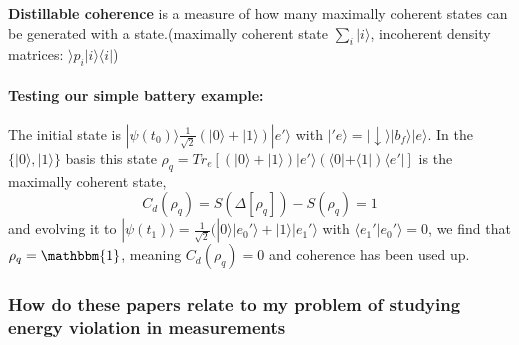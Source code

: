 \documentclass{article}
\begin{document}
\textbf{Distillable coherence} is a measure of how many maximally coherent states can be generated with a state.(maximally coherent state $\sum_{i}|i\rangle$, incoherent density matrices: $\rangle p_i|i\rangle\langle i|$)

\paragraph{Testing our simple battery example:}
The initial state is $|\psi(t_0)\rangle\frac{1}{\sqrt{2}}(|0\rangle+|1\rangle)|e'\rangle$ with $|'e\rangle=|\downarrow\rangle|b_f\rangle|e\rangle$. In the $\{|0\rangle,|1\rangle\}$ basis this state $\rho_q=Tr_e[(|0\rangle+|1\rangle)|e'\rangle(\langle0|+\langle1|)\langle e'|]$ is the maximally coherent state,
\begin{equation}
    C_d(\rho_q)=S(\Delta[\rho_q])-S(\rho_q)=1
\end{equation}
and evolving it to $|\psi(t_1)\rangle=\frac{1}{\sqrt{2}}(|0\rangle|e_0'\rangle+|1\rangle|e_1'\rangle$ with $\langle e_1'|e_0'\rangle=0$, we find that $\rho_q=\mathbbm{1}$, meaning $C_d(\rho_q)=0$ and coherence has been used up. 
\begin{comment}
\subsubsection{How is Coherence not catalytic}

It is firstly not catalytic because the state of the environment changes. It is "apparently" catlaytic because even thoght it chanegs, we can still re-use it to creat a another superposition just like the first one, and the resulting environment state is just as coherent as the initial one even if different.

But these 2 reasons why it is catalytic neglect entanglemenet. Entanglement between the env and sys but also between the qubit superpositions that are created.

In other words. what the original paper shows, is that you can use your coherent env state to creat a qubit superposition, and another and ... however many you want. So great, catalytic coherence. What the second paper shows is that this is neglecting to consider the entanglement between the qubit superpositions that is created, and that considering that, one of the low probability events can cause the coherent source to fully loose its coherence
\end{comment}

\subsubsection{How do these papers relate to my problem of studying energy violation in measurements}
\end{document}
